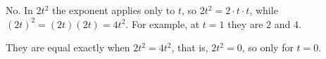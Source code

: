No. In $2t^2$ the exponent applies only to $t$, so $2t^2=2\cdot t\cdot t$, while $(2t)^2=(2t)(2t)=4t^2$. For example, at $t=1$ they are $2$ and $4$.

They are equal exactly when $2t^2=4t^2$, that is, $2t^2=0$, so only for $\boxed{t=0}$.

